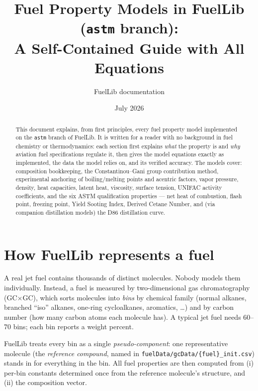 \documentclass[11pt]{article}
\title{Fuel Property Models in FuelLib (\texttt{astm} branch):\\
       A Self-Contained Guide with All Equations}
\author{FuelLib documentation}
\date{July 2026}
\begin{document}
\maketitle

\begin{abstract}
This document explains, from first principles, every fuel property model
implemented on the \texttt{astm} branch of FuelLib. It is written for a
reader with no background in fuel chemistry or thermodynamics: each section
first explains \emph{what} the property is and \emph{why} aviation fuel
specifications regulate it, then gives the model equations exactly as
implemented, the data the model relies on, and its verified accuracy.
The models cover: composition bookkeeping, the Constantinou--Gani group
contribution method, experimental anchoring of boiling/melting points and
acentric factors, vapor pressure, density, heat capacities, latent heat,
viscosity, surface tension, UNIFAC activity coefficients, and the six ASTM
qualification properties --- net heat of combustion, flash point, freezing
point, Yield Sooting Index, Derived Cetane Number, and (via companion
distillation models) the D86 distillation curve.
\end{abstract}

\tableofcontents

\section{How FuelLib represents a fuel}

A real jet fuel contains thousands of distinct molecules. Nobody models them
individually. Instead, a fuel is measured by two-dimensional gas
chromatography (GC$\times$GC), which sorts molecules into \emph{bins} by
chemical family (normal alkanes, branched ``iso'' alkanes, one-ring
cycloalkanes, aromatics, \ldots) and by carbon number (how many carbon atoms
each molecule has). A typical jet fuel needs 60--70 bins; each bin reports a
weight percent.

FuelLib treats every bin as a single \emph{pseudo-component}: one
representative molecule (the \emph{reference compound}, named in
\texttt{fuelData/gcData/\{fuel\}\_init.csv}) stands in for everything in the
bin. All fuel properties are then computed from (i) per-bin constants
determined once from the reference molecule's structure, and (ii) the
composition vector.
\end{document}
